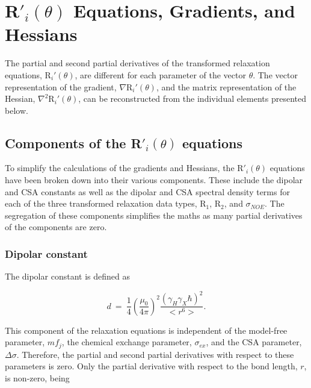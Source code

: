 
\newpage
\section{R$'_i(\theta)$ Equations, Gradients, and Hessians}

The partial and second partial derivatives of the transformed relaxation equations, R$_i'(\theta)$, are different for each parameter of the vector $\theta$.  The vector representation of the gradient, $\nabla \textrm{R}_i'(\theta)$, and the matrix representation of the Hessian, $\nabla^2 \textrm{R}_i'(\theta)$, can be reconstructed from the individual elements presented below.



\subsection{Components of the R$'_i(\theta)$ equations}

To simplify the calculations of the gradients and Hessians, the R$'_i(\theta)$ equations have been broken down into their various components.  These include the dipolar and CSA constants as well as the dipolar and CSA spectral density terms for each of the three transformed relaxation data types, R$_1$, R$_2$, and $\sigma_{NOE}$.  The segregation of these components simplifies the maths as many partial derivatives of the components are zero.


\subsubsection{Dipolar constant}

The dipolar constant is defined as

\begin{equation}
    d \ = \ \frac{1}{4} \left(\frac{\mu_0}{4\pi}\right)^2 \frac{\left( \gamma_H \gamma_X \hbar \right)^2}{<r^6>}. \label{eq: Ri': d}
\end{equation}

\noindent This component of the relaxation equations is independent of the model-free parameter, $mf_j$, the chemical exchange parameter, $\sigma_{ex}$, and the CSA parameter, $\Delta\sigma$.  Therefore, the partial and second partial derivatives with respect to these parameters is zero.  Only the partial derivative with respect to the bond length, $r$, is non-zero, being

